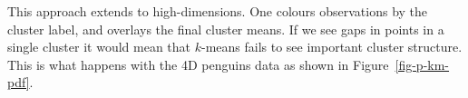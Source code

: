 \documentclass[
  letterpaper,
]{krantz}
\newenvironment{Shaded}{\begin{snugshade}}{\end{snugshade}}
\newcommand{\AttributeTok}[1]{\textcolor[rgb]{0.40,0.45,0.13}{#1}}
\newcommand{\DecValTok}[1]{\textcolor[rgb]{0.68,0.00,0.00}{#1}}
\newcommand{\FunctionTok}[1]{\textcolor[rgb]{0.28,0.35,0.67}{#1}}
\newcommand{\NormalTok}[1]{\textcolor[rgb]{0.00,0.23,0.31}{#1}}
\newcommand{\OtherTok}[1]{\textcolor[rgb]{0.00,0.23,0.31}{#1}}
\newcommand{\SpecialCharTok}[1]{\textcolor[rgb]{0.37,0.37,0.37}{#1}}
\begin{document}
This approach extends to high-dimensions. One colours observations by
the cluster label, and overlays the final cluster means. If we see gaps
in points in a single cluster it would mean that \(k\)-means fails to
see important cluster structure. This is what happens with the 4D
penguins data as shown in Figure~\ref{fig-p-km-pdf}.

\begin{Shaded}
\end{Shaded}
\end{document}
